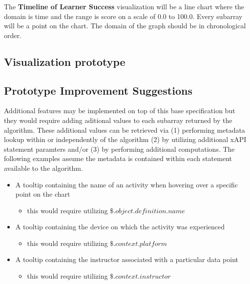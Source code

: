 \documentclass{article}
\begin{document}
The \textbf{Timeline of Learner Success} visualization will be a line chart
where the domain is time and the range is score on a scale of 0.0 to
100.0. Every subarray will be a point on the chart. The domain of the graph should be in
chronological order. \\

\subsection{Visualization prototype}


\subsection{Prototype Improvement Suggestions}
Additional features may be implemented on top of this base
specification but they would require adding aditional values to each
subarray returned by the algorithm. These additional values can be
retrieved via (1) performing metadata lookup within or independently of the
algorithm (2) by utilizing additional xAPI statement paramters and/or (3) by
performing additional computations. The following examples assume the
metadata is contained within each statement available to the algorithm.
\begin{itemize}
\item A tooltip containing the name of an activity when hovering
  over a specific point on the chart
  \begin{itemize}
  \item this would require utilizing $\$.object.definition.name$
  \end{itemize}
\item A tooltip containing the device on which the activity was experienced
  \begin{itemize}
  \item this would require utilizing $\$.context.platform$
  \end{itemize}
\item A tooltip containing the instructor associated with a
  particular data point
  \begin{itemize}
  \item this would require utilizing $\$.context.instructor$
  \end{itemize}
\end{itemize}
\end{document}
